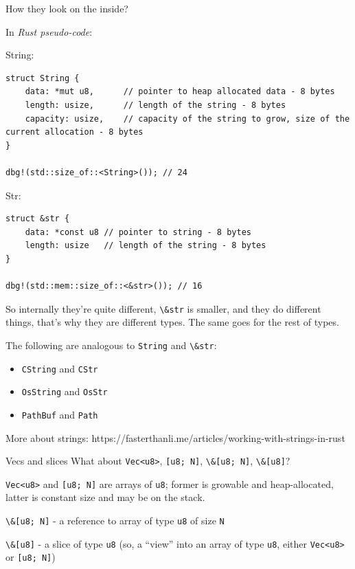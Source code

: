 \documentclass[
  9pt,
  ignorenonframetext,
]{beamer}
\newcommand{\passthrough}[1]{#1}
\providecommand{\tightlist}{%
  \setlength{\itemsep}{0pt}\setlength{\parskip}{0pt}}
\begin{document}
\begin{frame}[fragile]
How they look on the inside?

In \emph{Rust pseudo-code}:

String:

\begin{lstlisting}
struct String {
    data: *mut u8,      // pointer to heap allocated data - 8 bytes
    length: usize,      // length of the string - 8 bytes
    capacity: usize,    // capacity of the string to grow, size of the current allocation - 8 bytes
}

dbg!(std::size_of::<String>()); // 24
\end{lstlisting}

Str:

\begin{lstlisting}
struct &str {
    data: *const u8 // pointer to string - 8 bytes
    length: usize   // length of the string - 8 bytes
}

dbg!(std::mem::size_of::<&str>()); // 16
\end{lstlisting}
\end{frame}

\begin{frame}[fragile]
So internally they're quite different, \passthrough{\lstinline!\&str!}
is smaller, and they do different things, that's why they are different
types. The same goes for the rest of types.

The following are analogous to \passthrough{\lstinline!String!} and
\passthrough{\lstinline!\&str!}:

\begin{itemize}
\tightlist
\item
  \passthrough{\lstinline!CString!} and \passthrough{\lstinline!CStr!}
\item
  \passthrough{\lstinline!OsString!} and \passthrough{\lstinline!OsStr!}
\item
  \passthrough{\lstinline!PathBuf!} and \passthrough{\lstinline!Path!}
\end{itemize}

More about strings:
https://fasterthanli.me/articles/working-with-strings-in-rust
\end{frame}

\begin{frame}[fragile]{Vecs and slices}
\protect\hypertarget{vecs-and-slices}{}
What about \passthrough{\lstinline!Vec<u8>!},
\passthrough{\lstinline![u8; N]!}, \passthrough{\lstinline!\&[u8; N]!},
\passthrough{\lstinline!\&[u8]!}?

\passthrough{\lstinline!Vec<u8>!} and \passthrough{\lstinline![u8; N]!}
are arrays of \passthrough{\lstinline!u8!}; former is growable and
heap-allocated, latter is constant size and may be on the stack.

\passthrough{\lstinline!\&[u8; N]!} - a reference to array of type
\passthrough{\lstinline!u8!} of size \passthrough{\lstinline!N!}

\passthrough{\lstinline!\&[u8]!} - a slice of type
\passthrough{\lstinline!u8!} (so, a ``view'' into an array of type
\passthrough{\lstinline!u8!}, either \passthrough{\lstinline!Vec<u8>!}
or \passthrough{\lstinline![u8; N]!})
\end{frame}
\end{document}
